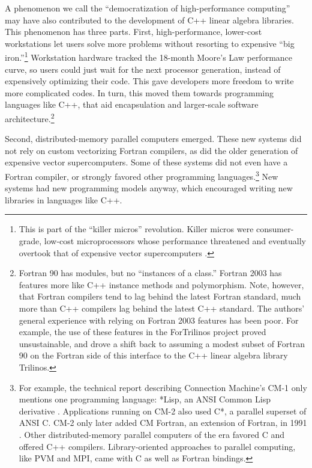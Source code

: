 A phenomenon we call the ``democratization of high-performance
computing'' may have also contributed to the development of C++ linear
algebra libraries.  This phenomenon has three parts.  First,
high-performance, lower-cost workstations let users solve more
problems without resorting to expensive ``big iron.''\footnote{This is
  part of the ``killer micros'' revolution.  Killer micros were
  consumer-grade, low-cost microprocessors whose performance
  threatened and eventually overtook that of expensive vector
  supercomputers \cite{killermicros1991}.} Workstation hardware tracked
the 18-month Moore's Law performance curve, so users could just wait
for the next processor generation, instead of expensively optimizing
their code.  This gave developers more freedom to write more
complicated codes.  In turn, this moved them towards programming
languages like C++, that aid encapsulation and larger-scale software
architecture.\footnote{Fortran 90 has modules, but no ``instances of a
  class.''  Fortran 2003 has features more like C++ instance methods
  and polymorphism.  Note, however, that Fortran compilers tend to lag
  behind the latest Fortran standard, much more than C++ compilers lag
  behind the latest C++ standard.  The authors' general experience
  with relying on Fortran 2003 features has been poor.  For example,
  the use of these features in the ForTrilinos project proved
  unsustainable, and drove a shift back to assuming a modest subset of
  Fortran 90 on the Fortran side of this interface to the C++ linear
  algebra library Trilinos.}

Second, distributed-memory parallel computers emerged.  These new
systems did not rely on custom vectorizing Fortran compilers, as did
the older generation of expensive vector supercomputers.  Some of
these systems did not even have a Fortran compiler, or strongly
favored other programming languages.\footnote{For example, the
  technical report describing Connection Machine's CM-1 only mentions
  one programming language: *Lisp, an ANSI Common Lisp derivative
  \cite{kahle1989cm1}.  Applications running on CM-2 also used C*, a
  parallel superset of ANSI C.  CM-2 only later added CM Fortran, an
  extension of Fortran, in 1991 \cite[p. 7]{Kennedy2007}.  Other
  distributed-memory parallel computers of the era favored C and
  offered C++ compilers.  Library-oriented approaches to parallel
  computing, like PVM and MPI, came with C as well as Fortran
  bindings.}  New systems had new programming models anyway, which
encouraged writing new libraries in languages like C++.


